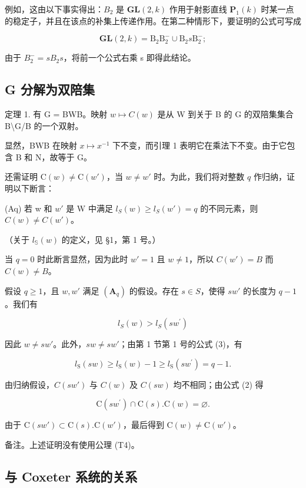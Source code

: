 例如，这由以下事实得出：\(B_{2}\) 是 \(\mathbf{GL}(2,k)\) 作用于射影直线 \(\mathbf{P}_{1}(k)\) 时某一点的稳定子，并且在该点的补集上传递作用。在第二种情形下，要证明的公式可写成

\[
\mathbf {G L} (2, k) = \mathrm{B} _ {2} \mathrm{B} _ {2} ^ {-} \cup \mathrm{B} _ {2} s \mathrm{B} _ {2} ^ {-};
\]

由于 \(B_{2}^{-} = sB_{2}s\)，将前一个公式右乘 s 即得此结论。

\subsection{G 分解为双陪集}

定理 1. 有 G = BWB。映射 \(w \mapsto C(w)\) 是从 W 到关于 B 的 G 的双陪集集合 B\textbackslash G/B 的一个双射。

显然，BWB 在映射 \(x \mapsto x^{-1}\) 下不变，而引理 1 表明它在乘法下不变。由于它包含 B 和 N，故等于 G。

还需证明 \(\mathrm{C}(w) \neq \mathrm{C}(w')\)，当 \(w \neq w'\) 时。为此，我们将对整数 \(q\) 作归纳，证明以下断言：

(Aq) 若 w 和 \(w'\) 是 W 中满足 \(l_{S}(w) \geqslant l_{S}(w') = q\) 的不同元素，则 \(C(w) \neq C(w')\)。

（关于 \(l_{\mathbb{S}}(w)\) 的定义，见 §1，第 1 号。）

当 \(q = 0\) 时此断言显然，因为此时 \(w' = 1\) 且 \(w \neq 1\)，所以 \(C(w') = B\) 而 \(C(w) \neq B\)。

假设 \(q \geqslant 1\)，且 \(w, w'\) 满足 \((\mathbf{A}_q)\) 的假设。存在 \(s \in S\)，使得 \(sw'\) 的长度为 \(q - 1\)。我们有

\[
l _ {S} (w) > l _ {S} \left(s w ^ {\prime}\right)\tag{6}
\]

因此 \(w \neq sw'\)。此外，\(sw \neq sw'\)；由第 1 节第 1 号的公式 (3)，有

\[
l _ {\mathrm{S}} (s w) \geqslant l _ {\mathrm{S}} (w) - 1 \geqslant l _ {\mathrm{S}} (s w ^ {\prime}) = q - 1.\tag{7}
\]

由归纳假设，\(C(sw')\) 与 \(C(w)\) 及 \(C(sw)\) 均不相同；由公式 (2) 得

\[
\mathrm{C} (s w ^ {\prime}) \cap \mathrm{C} (s). \mathrm{C} (w) = \varnothing .\tag{8}
\]

由于 \(\mathrm{C}(sw') \subset \mathrm{C}(s).\mathrm{C}(w')\)，最后得到 \(\mathrm{C}(w) \neq \mathrm{C}(w')\)。

备注。上述证明没有使用公理 (T4)。

\subsection{与 Coxeter 系统的关系}

